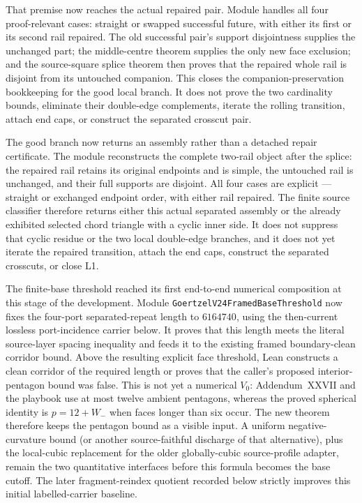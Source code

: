 \documentclass[11pt]{article}
\theoremstyle{definition}
\begin{document}
That premise now reaches the actual repaired pair.  Module
handles all four proof-relevant cases: straight or swapped successful future,
with either its first or its second rail repaired.  The old successful pair's
support disjointness supplies the unchanged part; the middle-centre theorem
supplies the only new face exclusion; and the source-square splice theorem
then proves that the repaired whole rail is disjoint from its untouched
companion.  This closes the companion-preservation bookkeeping for the good
local branch.  It does not prove the two cardinality bounds, eliminate their
double-edge complements, iterate the rolling transition, attach end caps, or
construct the separated crosscut pair.

The good branch now returns an assembly rather than a detached repair
certificate.  The module
reconstructs the complete two-rail object after the splice: the repaired rail
retains its original endpoints and is simple, the untouched rail is unchanged,
and their full supports are disjoint.  All four cases are explicit ---
straight or exchanged endpoint order, with either rail repaired.  The finite
source classifier therefore returns either this actual separated assembly or
the already exhibited selected chord triangle with a cyclic inner side.  It
does not suppress that cyclic residue or the two local double-edge branches,
and it does not yet iterate the repaired transition, attach the end caps,
construct the separated crosscuts, or close L1.

The finite-base threshold reached its first end-to-end numerical composition
at this stage of the development.
Module
\texttt{GoertzelV24FramedBaseThreshold} now fixes the four-port
separated-repeat length to $6164740$, using the then-current lossless
port-incidence carrier below.  It proves that this length meets the literal
source-layer spacing inequality and feeds it to the existing framed
boundary-clean corridor bound.  Above the resulting explicit face threshold,
Lean constructs a clean corridor of the required length or proves that the
caller's proposed interior-pentagon bound was false.  This is not yet a
numerical $V_0$: Addendum~XXVII and the playbook use at most twelve ambient
pentagons, whereas the proved spherical identity is
$p=12+W_-$ when faces longer than six occur.  The new theorem therefore keeps
the pentagon bound as a visible input.  A uniform negative-curvature bound (or
another source-faithful discharge of that alternative), plus the local-cubic
replacement for the older globally-cubic source-profile adapter, remain the
two quantitative interfaces before this formula becomes the base cutoff.  The
later fragment-reindex quotient recorded below strictly improves this initial
labelled-carrier baseline.
\end{document}
